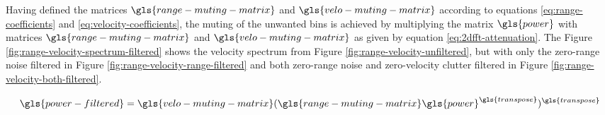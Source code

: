 Having defined the matrices $\gls{range-muting-matrix}$ and $\gls{velo-muting-matrix}$ according to equations
\ref{eq:range-coefficients} and \ref{eq:velocity-coefficients},
the muting of the unwanted bins is achieved by multiplying the matrix
$\gls{power}$ with matrices $\gls{range-muting-matrix}$ and $\gls{velo-muting-matrix}$ as given by equation \ref{eq:2dfft-attenuation}.
The Figure \ref{fig:range-velocity-spectrum-filtered} shows the velocity spectrum 
from Figure \ref{fig:range-velocity-unfiltered}, but with only the zero-range noise filtered 
in Figure \ref{fig:range-velocity-range-filtered} and both zero-range noise and zero-velocity clutter
filtered in Figure \ref{fig:range-velocity-both-filtered}.

\begin{equation}
    \label{eq:2dfft-attenuation}
    \gls{power-filtered} = \gls{velo-muting-matrix} ( \gls{range-muting-matrix} \gls{power}^{\gls{transpose}} )^{\gls{transpose}}
\end{equation}

